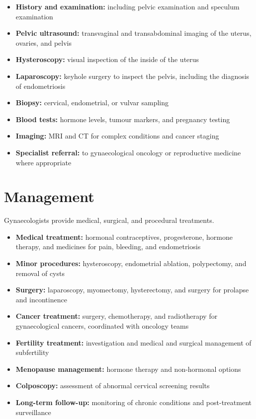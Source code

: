 \begin{itemize}
    \item \textbf{History and examination:} including pelvic examination and speculum examination
    \item \textbf{Pelvic ultrasound:} transvaginal and transabdominal imaging of the uterus, ovaries, and pelvis
    \item \textbf{Hysteroscopy:} visual inspection of the inside of the uterus
    \item \textbf{Laparoscopy:} keyhole surgery to inspect the pelvis, including the diagnosis of endometriosis
    \item \textbf{Biopsy:} cervical, endometrial, or vulvar sampling
    \item \textbf{Blood tests:} hormone levels, tumour markers, and pregnancy testing
    \item \textbf{Imaging:} MRI and CT for complex conditions and cancer staging
    \item \textbf{Specialist referral:} to gynaecological oncology or reproductive medicine where appropriate
\end{itemize}

\section*{Management}
Gynaecologists provide medical, surgical, and procedural treatments.

\begin{itemize}
    \item \textbf{Medical treatment:} hormonal contraceptives, progesterone, hormone therapy, and medicines for pain, bleeding, and endometriosis
    \item \textbf{Minor procedures:} hysteroscopy, endometrial ablation, polypectomy, and removal of cysts
    \item \textbf{Surgery:} laparoscopy, myomectomy, hysterectomy, and surgery for prolapse and incontinence
    \item \textbf{Cancer treatment:} surgery, chemotherapy, and radiotherapy for gynaecological cancers, coordinated with oncology teams
    \item \textbf{Fertility treatment:} investigation and medical and surgical management of subfertility
    \item \textbf{Menopause management:} hormone therapy and non-hormonal options
    \item \textbf{Colposcopy:} assessment of abnormal cervical screening results
    \item \textbf{Long-term follow-up:} monitoring of chronic conditions and post-treatment surveillance
\end{itemize}

